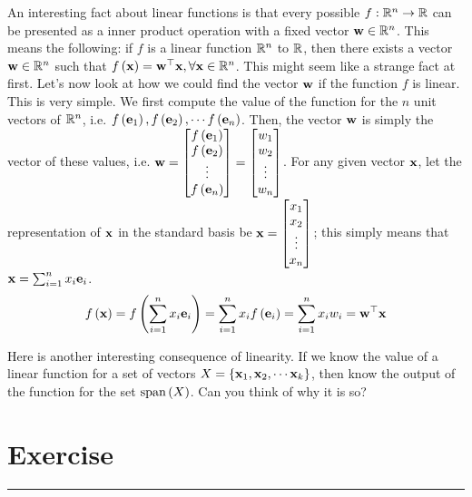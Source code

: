 An interesting fact about linear functions is that every possible $f: \mathbb{R}^n \to \mathbb{R}$ can be presented as a inner product operation with a fixed vector $\mathbf{w} \in \mathbb{R}^n$. This means the following: if $f$ is a linear function $\mathbb{R}^n$ to $\mathbb{R}$, then there exists a vector $\mathbf{w} \in \mathbb{R}^n$ such that $f\left( \mathbf{x}\right) = \mathbf{w}^\top\mathbf{x}, \forall \mathbf{x} \in \mathbb{R}^n$. This might seem like a strange fact at first. Let's now look at how we could find the vector $\mathbf{w}$ if the function $f$ is linear. This is very simple. We first compute the value of the function for the $n$ unit vectors of $\mathbb{R}^n$, i.e. $f\left( \mathbf{e}_1\right), f\left( \mathbf{e}_2\right), \cdots f\left( \mathbf{e}_n\right)$. Then, the vector $\mathbf{w}$ is simply the vector of these values, i.e. $\mf{w} = \bmxc f\pp{\mf{e}_1} \\ f\pp{\mf{e}_2} \\ \vdots \\ f\pp{\mf{e}_n} \emx = \bmxc w_1 \\ w_2 \\ \vdots \\ w_n \emx$. For any given vector $\mathbf{x}$, let the representation of $\mathbf{x}$ in the standard basis be $\mf{x} = \bmxc x_1 \\x_2 \\ \vdots \\ x_n\emx$; this simply means that $\mathbf{x} = \sum_{i=1}^n x_i\mathbf{e}_i$.
\[ 
\begin{split}
    f\left( \mathbf{x}\right) = f\left( \sum_{i=1}^nx_i\mathbf{e}_i\right) = \sum_{i=1}^nx_if\left( \mathbf{e}_i\right) = \sum_{i=1}^nx_iw_i = \mathbf{w}^\top\mathbf{x}
\end{split}
\]

Here is another interesting consequence of linearity. If we know the value of a linear function for a set of vectors $X = \left\{ \mathbf{x}_1, \mathbf{x}_2, \cdots \mathbf{x}_k \right\}$, then know the output of the function for the set $\text{span}\left( X\right)$. Can you think of why it is so?

\section{Exercise}
\vspace{-0.5cm}
\begin{center}
    \rule{\textwidth}{1pt}
\end{center}

